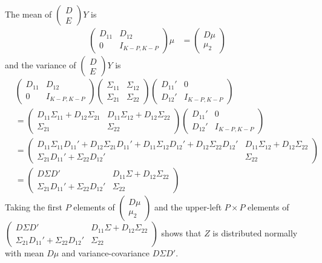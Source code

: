 \documentclass{article}[12pt]
\begin{document}
\begin{enumerate}
	The mean of $\begin{pmatrix} D \\ E \end{pmatrix} Y$ is
	\begin{align*}
		\begin{pmatrix} D_{11} & D_{12} \\ 0 & I_{K-P,K-P} \end{pmatrix} \mu &= \begin{pmatrix} D\mu \\ \mu_2 \end{pmatrix}
	\end{align*}
	and the variance of $\begin{pmatrix} D \\ E \end{pmatrix} Y$ is
	\begin{align*}
		&\begin{pmatrix} D_{11} & D_{12} \\ 0 & I_{K-P,K-P} \end{pmatrix}
			\begin{pmatrix} \Sigma_{11} & \Sigma_{12} \\ \Sigma_{21} & \Sigma_{22} \end{pmatrix}
			\begin{pmatrix} D_{11}' & 0 \\ D_{12}' & I_{K-P,K-P} \end{pmatrix} \\
		&= \begin{pmatrix} D_{11}\Sigma_{11} + D_{12}\Sigma_{21} & D_{11}\Sigma_{12} + D_{12}\Sigma_{22} \\ \Sigma_{21} & \Sigma_{22} \end{pmatrix}
			\begin{pmatrix} D_{11}' & 0 \\ D_{12}' & I_{K-P,K-P} \end{pmatrix} \\
		&= \begin{pmatrix} D_{11}\Sigma_{11}D_{11}' + D_{12}\Sigma_{21}D_{11}' + D_{11}\Sigma_{12}D_{12}' + D_{12}\Sigma_{22}D_{12}' & D_{11}\Sigma_{12} + D_{12}\Sigma_{22} \\
		\Sigma_{21}D_{11}' + \Sigma_{22}D_{12}' & \Sigma_{22} \end{pmatrix} \\
		&= \begin{pmatrix} D \Sigma D' & D_{11}\Sigma + D_{12}\Sigma_{22} \\ \Sigma_{21}D_{11}' + \Sigma_{22}D_{12}' & \Sigma_{22} \end{pmatrix}
	\end{align*}
	Taking the first $P$ elements of $\begin{pmatrix} D\mu \\ \mu_2 \end{pmatrix}$ and the upper-left $P \times P$ elements of $\begin{pmatrix} D \Sigma D' & D_{11}\Sigma + D_{12}\Sigma_{22} \\ \Sigma_{21}D_{11}' + \Sigma_{22}D_{12}' & \Sigma_{22} \end{pmatrix}$ shows that $Z$ is distributed normally with mean $D \mu$ and variance-covariance $D \Sigma D'$.


\end{enumerate}
\end{document}
